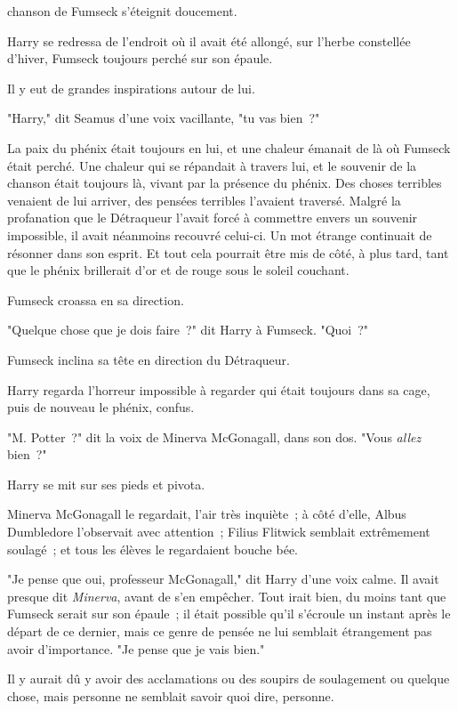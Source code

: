 
 chanson de Fumseck s'éteignit doucement.

\hplettrineextrapara
Harry se redressa de l'endroit où il avait été allongé, sur l'herbe constellée d'hiver, Fumseck toujours perché sur son épaule.

Il y eut de grandes inspirations autour de lui.

"Harry," dit Seamus d'une voix vacillante, "tu vas bien~?"

La paix du phénix était toujours en lui, et une chaleur émanait de là où Fumseck était perché. Une chaleur qui se répandait à travers lui, et le souvenir de la chanson était toujours là, vivant par la présence du phénix. Des choses terribles venaient de lui arriver, des pensées terribles l'avaient traversé. Malgré la profanation que le Détraqueur l'avait forcé à commettre envers un souvenir impossible, il avait néanmoins recouvré celui-ci. Un mot étrange continuait de résonner dans son esprit. Et tout cela pourrait être mis de côté, à plus tard, tant que le phénix brillerait d'or et de rouge sous le soleil couchant.

Fumseck croassa en sa direction.

"Quelque chose que je dois faire~?" dit Harry à Fumseck. "Quoi~?"

Fumseck inclina sa tête en direction du Détraqueur.

Harry regarda l'horreur impossible à regarder qui était toujours dans sa cage, puis de nouveau le phénix, confus.

"M. Potter~?" dit la voix de Minerva McGonagall, dans son dos. "Vous \emph{allez} bien~?"

Harry se mit sur ses pieds et pivota.

Minerva McGonagall le regardait, l'air très inquiète~; à côté d'elle, Albus Dumbledore l'observait avec attention~; Filius Flitwick semblait extrêmement soulagé~; et tous les élèves le regardaient bouche bée.

"Je pense que oui, professeur McGonagall," dit Harry d'une voix calme. Il avait presque dit \emph{Minerva}, avant de s'en empêcher. Tout irait bien, du moins tant que Fumseck serait sur son épaule~; il était possible qu'il s'écroule un instant après le départ de ce dernier, mais ce genre de pensée ne lui semblait étrangement pas avoir d'importance. "Je pense que je vais bien."

Il y aurait dû y avoir des acclamations ou des soupirs de soulagement ou quelque chose, mais personne ne semblait savoir quoi dire, personne.

